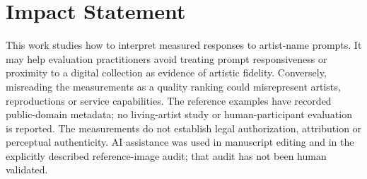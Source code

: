 \documentclass{article}
\begin{document}
\section*{Impact Statement}
This work studies how to interpret measured responses to artist-name prompts.
It may help evaluation practitioners avoid treating prompt responsiveness or
proximity to a digital collection as evidence of artistic fidelity. Conversely,
misreading the measurements as a quality ranking could misrepresent artists,
reproductions or service capabilities. The reference examples have recorded
public-domain metadata; no living-artist study or human-participant evaluation
is reported. The measurements do not establish legal authorization, attribution
or perceptual authenticity. AI assistance was used in manuscript editing and
in the explicitly described reference-image audit; that audit has not been
human validated.


\clearpage
\appendix
\onecolumn

\end{document}
